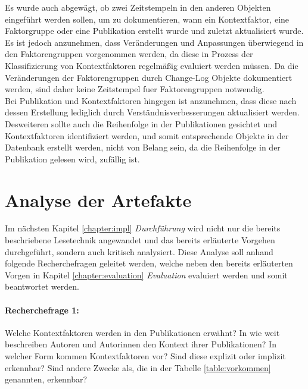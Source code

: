 Es wurde auch abgewägt, ob zwei Zeitstempeln in den anderen Objekten eingeführt werden sollen, um zu dokumentieren, wann ein Kontextfaktor, eine Faktorgruppe oder eine Publikation erstellt wurde und zuletzt aktualisiert wurde. \\
Es ist jedoch anzunehmen, dass Veränderungen und Anpassungen überwiegend in den Faktorengruppen vorgenommen werden, da diese in Prozess der Klassifizierung von Kontextfaktoren regelmäßig evaluiert werden müssen. Da die Veränderungen der Faktorengruppen durch Change-Log Objekte dokumentiert werden, sind daher keine Zeitstempel fuer Faktorengruppen notwendig.\\
Bei Publikation und Kontextfaktoren hingegen ist anzunehmen, dass diese nach dessen Erstellung lediglich durch Verständnisverbesserungen aktualisiert werden.  \\
Desweiteren sollte auch die Reihenfolge in der Publikationen gesichtet und Kontextfaktoren identifiziert werden, und somit entsprechende Objekte in der Datenbank erstellt werden, nicht von Belang sein, da die Reihenfolge in der Publikation gelesen wird, zufällig ist.\\



\section{Analyse der Artefakte}
\label{sec:analysis-step}
Im nächsten Kapitel \ref{chapter:impl} \textit{Durchführung} wird nicht nur die bereits beschriebene Lesetechnik angewandet und das bereits erläuterte Vorgehen durchgeführt, sondern auch kritisch analysiert. Diese Analyse soll anhand folgende Recherchefragen geleitet werden, welche neben den bereits erläuterten Vorgen in Kapitel \ref{chapter:evaluation} \textit{Evaluation} evaluiert werden und somit beantwortet werden. \\

\paragraph{Recherchefrage 1:} Welche Kontextfaktoren werden in den Publikationen erwähnt? In wie weit beschreiben Autoren und Autorinnen den Kontext ihrer Publikationen? In welcher Form kommen Kontextfaktoren vor? Sind diese explizit oder implizit erkennbar? Sind andere Zwecke als, die in der Tabelle \ref{table:vorkommen} genannten, erkennbar? 

